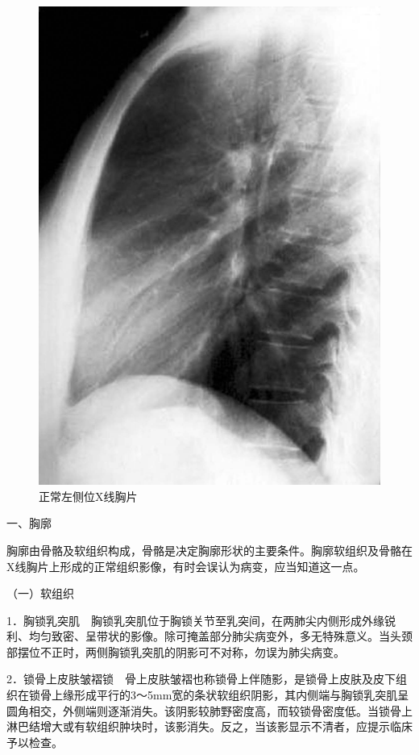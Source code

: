 \begin{figure}[!htbp]
 \centering
 \includegraphics{./images/Image00130.jpg}
 \captionsetup{justification=centering}
 \caption{正常左侧位X线胸片}
 \label{fig3-1-2}
  \end{figure} 

一、胸廓

胸廓由骨骼及软组织构成，骨骼是决定胸廓形状的主要条件。胸廓软组织及骨骼在X线胸片上形成的正常组织影像，有时会误认为病变，应当知道这一点。

（一）软组织

1．胸锁乳突肌　胸锁乳突肌位于胸锁关节至乳突间，在两肺尖内侧形成外缘锐利、均匀致密、呈带状的影像。除可掩盖部分肺尖病变外，多无特殊意义。当头颈部摆位不正时，两侧胸锁乳突肌的阴影可不对称，勿误为肺尖病变。

2．锁骨上皮肤皱褶锁　骨上皮肤皱褶也称锁骨上伴随影，是锁骨上皮肤及皮下组织在锁骨上缘形成平行的3～5mm宽的条状软组织阴影，其内侧端与胸锁乳突肌呈圆角相交，外侧端则逐渐消失。该阴影较肺野密度高，而较锁骨密度低。当锁骨上淋巴结增大或有软组织肿块时，该影消失。反之，当该影显示不清者，应提示临床予以检查。

